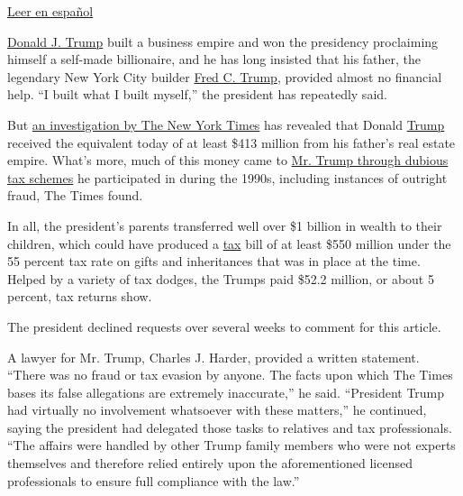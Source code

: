 \href{https://www.nytimes3xbfgragh.onion/es/2018/10/02/investigacion-fortuna-donald-trump/?}{Leer
en español}

\href{https://www.nytimes3xbfgragh.onion/2020/07/09/us/politics/trump-taxes.html}{Donald
J. Trump} built a business empire and won the presidency proclaiming
himself a self-made billionaire, and he has long insisted that his
father, the legendary New York City builder
\href{https://www.nytimes3xbfgragh.onion/2020/07/28/us/politics/donald-fred-trump.html}{Fred
C. Trump}, provided almost no financial help. ``I built what I built
myself,'' the president has repeatedly said.

But
\href{https://www.nytimes3xbfgragh.onion/interactive/2018/10/02/us/politics/donald-trump-tax-schemes-fred-trump.html}{an
investigation by The New York Times} has revealed that Donald
\href{https://www.nytimes3xbfgragh.onion/interactive/2018/10/02/us/politics/donald-trump-tax-schemes-fred-trump.html?action=click\&module=Top\%20Stories\&pgtype=Homepage}{Trump}
received the equivalent today of at least \$413 million from his
father's real estate empire. What's more, much of this money came to
\href{https://www.nytimes3xbfgragh.onion/interactive/2019/05/07/us/politics/donald-trump-taxes.html}{Mr.
Trump through dubious tax schemes} he participated in during the 1990s,
including instances of outright fraud, The Times found.

In all, the president's parents transferred well over \$1 billion in
wealth to their children, which could have produced a
\href{https://www.nytimes3xbfgragh.onion/2020/07/09/us/politics/trump-taxes.html}{tax}
bill of at least \$550 million under the 55 percent tax rate on gifts
and inheritances that was in place at the time. Helped by a variety of
tax dodges, the Trumps paid \$52.2 million, or about 5 percent, tax
returns show.

The president declined requests over several weeks to comment for this
article.

A lawyer for Mr. Trump, Charles J. Harder, provided a written statement.
``There was no fraud or tax evasion by anyone. The facts upon which The
Times bases its false allegations are extremely inaccurate,'' he said.
``President Trump had virtually no involvement whatsoever with these
matters,'' he continued, saying the president had delegated those tasks
to relatives and tax professionals. ``The affairs were handled by other
Trump family members who were not experts themselves and therefore
relied entirely upon the aforementioned licensed professionals to ensure
full compliance with the law.''

